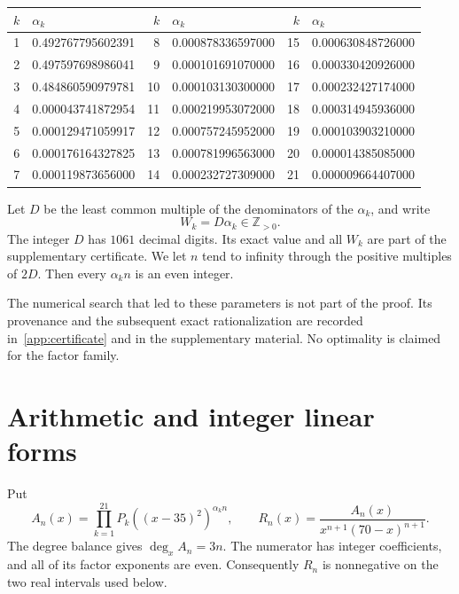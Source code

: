 \documentclass[preprint,12pt]{elsarticle}
\theoremstyle{definition}
\newcommand{\Z}{\mathbb Z}
\begin{document}
\begin{center}
\small
\begin{tabular}{r@{\quad}l r@{\quad}l r@{\quad}l}
\toprule
$k$&$\alpha_k$&$k$&$\alpha_k$&$k$&$\alpha_k$\\
\midrule
1 & 0.492767795602391 & 8 & 0.000878336597000 & 15 & 0.000630848726000 \\
2 & 0.497597698986041 & 9 & 0.000101691070000 & 16 & 0.000330420926000 \\
3 & 0.484860590979781 & 10 & 0.000103130300000 & 17 & 0.000232427174000 \\
4 & 0.000043741872954 & 11 & 0.000219953072000 & 18 & 0.000314945936000 \\
5 & 0.000129471059917 & 12 & 0.000757245952000 & 19 & 0.000103903210000 \\
6 & 0.000176164327825 & 13 & 0.000781996563000 & 20 & 0.000014385085000 \\
7 & 0.000119873656000 & 14 & 0.000232727309000 & 21 & 0.000009664407000 \\
\bottomrule
\end{tabular}
\end{center}

Let $D$ be the least common multiple of the denominators of the
$\alpha_k$, and write
\[
 W_k=D\alpha_k\in\Z_{>0}.
\]
The integer $D$ has $1061$ decimal digits.  Its exact value and all $W_k$
are part of the supplementary certificate.  We let $n$ tend to infinity
through the positive multiples of $2D$.  Then every $\alpha_k n$ is an even
integer.

The numerical search that led to these parameters is not part of the proof.
Its provenance and the subsequent exact rationalization are recorded
in~\ref{app:certificate} and in the supplementary material.  No
optimality is claimed for the factor family.

\section{Arithmetic and integer linear forms}

Put
\begin{equation}\label{eq:An-Rn}
 A_n(x)=\prod_{k=1}^{21}
 P_k((x-35)^2)^{\alpha_k n},
 \qquad
 R_n(x)=
 \frac{A_n(x)}{x^{n+1}(70-x)^{n+1}}.
\end{equation}
The degree balance gives $\deg_x A_n=3n$.  The numerator has integer
coefficients, and all of its factor exponents are even.  Consequently
$R_n$ is nonnegative on the two real intervals used below.
\end{document}
